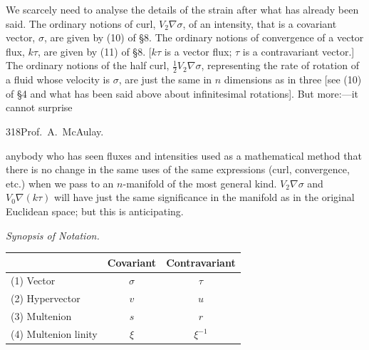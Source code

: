 \documentclass[11pt]{article}
\begin{document}
\indent We scarcely need to analyse the details of the strain after what has already been said. The ordinary notions of curl, $V_2\nabla\sigma$, of an intensity, that is a covariant vector, $\sigma$, are given by (10) of §8. The ordinary notions of convergence of a vector flux, $k\tau$, are given by (11) of §8. [$k\tau$ is a vector flux; $\tau$ is a contravariant vector.] The ordinary notions of the half curl, $\tfrac12V_2\nabla\sigma$, representing the rate of rotation of a fluid whose velocity is $\sigma$, are just the same in $n$ dimensions as in three [see (10) of §4 and what has been said above about infinitesimal rotations]. But more:---it cannot surprise

\newpage\thispagestyle{empty}\begin{center}318\hfill Prof.\ A.\ McAulay.\end{center}
anybody who has seen fluxes and intensities used as a mathematical method that there is no change in the same uses of the same expressions (curl, convergence, etc.) when we pass to an $n$-manifold of the most general kind. $V_2\nabla\sigma$ and $V_0\nabla(k\tau)$ will have just the same significance in the manifold as in the original Euclidean space; but this is anticipating.

\begin{center}\emph{Synopsis of Notation.}\end{center}
\begin{center}\begin{tabular}{|l|c|c|}\hline
& Covariant & Contravariant\\\hline
(1) Vector & $\sigma$ & $\tau$\\\hline
(2) Hypervector & $v$ & $u$\\\hline
(3) Multenion & $s$ & $r$\\\hline
(4) Multenion linity & $\xi$ & $\xi^{-1}$\\\hline
\end{tabular}\end{center}
\end{document}
